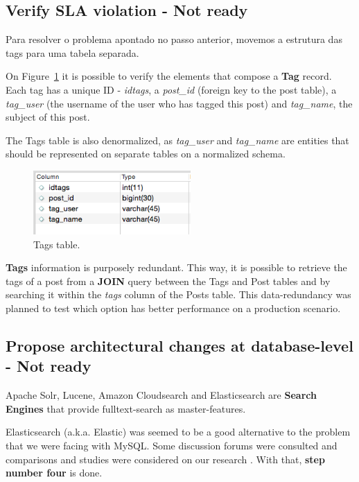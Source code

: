 \subsection{Verify SLA violation - Not ready}

Para resolver o problema apontado no passo anterior, movemos a estrutura das tags para uma tabela separada. 

On Figure~\ref{fig:tagTable} it is possible to verify the elements that compose a \textbf{Tag} record. Each tag has a unique ID - \textit{idtags}, a \textit{post\_id} (foreign key to the post table), a \textit{tag\_user} (the username of the user who has tagged this post) and \textit{tag\_name}, the subject of this post. 

The Tags table is also denormalized, as \textit{tag\_user} and \textit{tag\_name} are entities that should be represented on separate tables on a normalized schema.

\begin{figure}[ht!]
\centering
\includegraphics[width=60mm]{tagTable.png}
\caption{Tags table.\label{fig:tagTable}}
\end{figure}

\textbf{Tags} information is purposely redundant. This way, it is possible to retrieve the tags of a post from a \textbf{JOIN} query between the Tags and Post tables and by searching it within the \textit{tags} column of the Posts table. This data-redundancy was planned to test which option has better performance on a production scenario.  


\subsection{Propose architectural changes at database-level - Not ready}

Apache Solr, Lucene, Amazon Cloudsearch and Elasticsearch are \textbf{Search Engines} that provide fulltext-search as master-features. 

Elasticsearch (a.k.a. Elastic) was seemed to be a good alternative to the problem that we were facing with MySQL. Some discussion forums were consulted and comparisons and studies were considered on our research \cite{StackOverflowElastic} \cite{SolrVsES} \cite{quoraES}. With that, \textbf{step number four} is done. 

